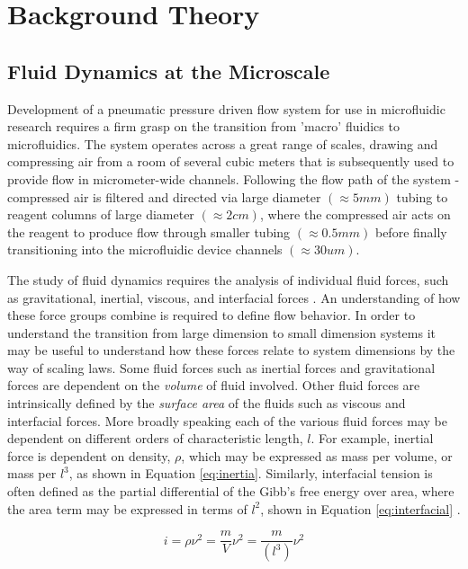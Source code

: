 \chapter{Background Theory}

\section{Fluid Dynamics at the Microscale}
Development of a pneumatic pressure driven flow system for use in microfluidic research requires a firm grasp on the transition from 'macro' fluidics to microfluidics. The system operates across a great range of scales, drawing and compressing air from a room of several cubic meters that is subsequently used to provide flow in micrometer-wide channels. Following the flow path of the system - compressed air is filtered and directed via large diameter $(\approx 5mm)$ tubing to reagent columns of large diameter $(\approx 2cm)$, where the compressed air acts on the reagent to produce flow through smaller tubing $(\approx 0.5mm)$ before finally transitioning into the microfluidic device channels $(\approx 30um)$. 

The study of fluid dynamics requires the analysis of individual fluid forces, such as gravitational, inertial, viscous, and interfacial forces \cite{Bruus2008}. An understanding of how these force groups combine is required to define flow behavior. In order to understand the transition from large dimension to small dimension systems it may be useful to understand how these forces relate to system dimensions by the way of scaling laws. Some fluid forces such as inertial forces and gravitational forces are dependent on the \emph{volume} of fluid involved. Other fluid forces are intrinsically defined by the \emph{surface area} of the fluids such as viscous and interfacial forces. More broadly speaking each of the various fluid forces may be dependent on different orders of characteristic length, $l$. For example, inertial force is dependent on density, $\rho$, which may be expressed as mass per volume, or mass per $l^3$, as shown in Equation \vref{eq:inertia}. Similarly, interfacial tension is often defined as the partial differential of the Gibb's free energy over area, where the area term may be expressed in terms of $l^2$, shown in Equation \vref{eq:interfacial} \cite{Baroud2010}.


\begin{equation}
i = \rho \nu^2 = \frac{m}{V}\nu^2 = \frac{m}{(l^3)}\nu^2 
\label{eq:inertia}
\end{equation}

